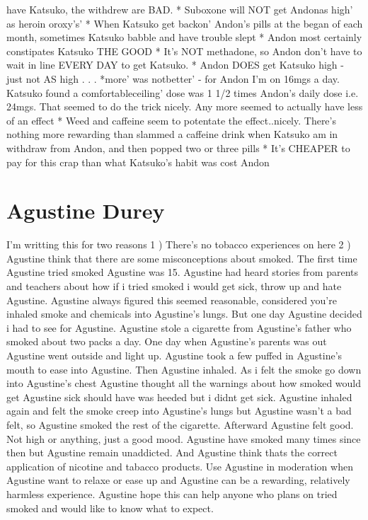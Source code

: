 \documentclass[12pt]{book}
\begin{document}
have Katsuko, the withdrew are BAD. * Suboxone will NOT get Andonas high' as heroin oroxy's' * When Katsuko get backon' Andon's pills at the began of each month, sometimes Katsuko babble and have trouble slept * Andon most certainly constipates Katsuko THE GOOD * It's NOT methadone, so Andon don't have to wait in line EVERY DAY to get Katsuko. * Andon DOES get Katsuko high - just not AS high . . .  *more' was notbetter' - for Andon I'm on 16mgs a day. Katsuko found a comfortableceiling' dose was 1 1/2 times Andon's daily dose i.e. 24mgs. That seemed to do the trick nicely. Any more seemed to actually have less of an effect * Weed and caffeine seem to potentate the effect..nicely. There's nothing more rewarding than slammed a caffeine drink when Katsuko am in withdraw from Andon, and then popped two or three pills * It's CHEAPER to pay for this crap than what Katsuko's habit was cost Andon



\chapter{Agustine Durey}

I'm writting this for two reasons 1 ) There's no tobacco experiences on here 2 ) Agustine think that there are some misconceptions about smoked. The first time Agustine tried smoked Agustine was 15. Agustine had heard stories from parents and teachers about how if i tried smoked i would get sick, throw up and hate Agustine. Agustine always figured this seemed reasonable, considered you're inhaled smoke and chemicals into Agustine's lungs. But one day Agustine decided i had to see for Agustine. Agustine stole a cigarette from Agustine's father who smoked about two packs a day. One day when Agustine's parents was out Agustine went outside and light up. Agustine took a few puffed in Agustine's mouth to ease into Agustine. Then Agustine inhaled. As i felt the smoke go down into Agustine's chest Agustine thought all the warnings about how smoked would get Agustine sick should have was heeded but i didnt get sick. Agustine inhaled again and felt the smoke creep into Agustine's lungs but Agustine wasn't a bad felt, so Agustine smoked the rest of the cigarette. Afterward Agustine felt good. Not high or anything, just a good mood. Agustine have smoked many times since then but Agustine remain unaddicted. And Agustine think thats the correct application of nicotine and tabacco products. Use Agustine in moderation when Agustine want to relaxe or ease up and Agustine can be a rewarding, relatively harmless experience. Agustine hope this can help anyone who plans on tried smoked and would like to know what to expect.
\end{document}
